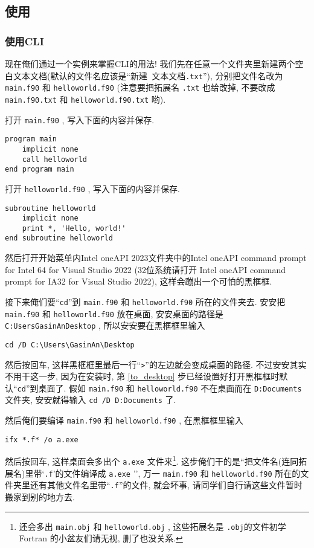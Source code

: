 \subsection{使用}\label{use_ifx}

\subsubsection{使用CLI}

现在俺们通过一个实例来掌握CLI的用法! 我们先在任意一个文件夹里新建两个空白文本文档(默认的文件名应该是``\textsf{新建}\texttt{\ }\textsf{文本文档}\texttt{.txt}''), 分别把文件名改为 \texttt{main.f90} 和 \texttt{helloworld.f90} (注意要把拓展名 \texttt{.txt} 也给改掉, 不要改成 \texttt{main.f90.txt} 和 \texttt{helloworld.f90.txt} 哟).

打开 \texttt{main.f90} , 写入下面的内容并保存.
\begin{lstlisting}
program main
    implicit none
    call helloworld
end program main
\end{lstlisting}

打开 \texttt{helloworld.f90} , 写入下面的内容并保存.
\begin{lstlisting}
subroutine helloworld
    implicit none
    print *, 'Hello, world!'
end subroutine helloworld
\end{lstlisting}

然后打开开始菜单内Intel oneAPI 2023文件夹中的Intel oneAPI command prompt for Intel 64 for Visual Studio 2022 (32位系统请打开 Intel oneAPI command prompt for IA32 for Visual Studio 2022), 这样会蹦出一个可怕的黑框框.

接下来俺们要``\texttt{cd}''到 \texttt{main.f90} 和 \texttt{helloworld.f90} 所在的文件夹去. 安安把 \texttt{main.f90} 和 \texttt{helloworld.f90} 放在桌面, 安安桌面的路径是\texttt{C:\bs{}Users\bs{}GasinAn\bs{}Desktop} , 所以安安要在黑框框里输入
\begin{verbatim}
cd /D C:\Users\GasinAn\Desktop
\end{verbatim}
然后按回车, 这样黑框框里最后一行``\texttt{>}''的左边就会变成桌面的路径. 不过安安其实不用干这一步, 因为在安装时, 第 \ref{to_desktop} 步已经设置好打开黑框框时默认``\texttt{cd}''到桌面了. 假如 \texttt{main.f90} 和 \texttt{helloworld.f90} 不在桌面而在 \texttt{D:\bs{}Documents} 文件夹, 安安就得输入 \texttt{cd /D D:\bs{}Documents} 了.

然后俺们要编译 \texttt{main.f90} 和 \texttt{helloworld.f90} , 在黑框框里输入
\begin{verbatim}
ifx *.f* /o a.exe
\end{verbatim}
然后按回车, 这样桌面会多出个 \texttt{a.exe} 文件来\footnote{还会多出 \texttt{main.obj} 和 \texttt{helloworld.obj} , 这些拓展名是 \texttt{.obj}的文件初学 Fortran 的小盆友们请无视, 删了也没关系.}. 这步俺们干的是``把文件名(连同拓展名)里带`\texttt{.f}'的文件编译成 \texttt{a.exe} '', 万一 \texttt{main.f90} 和 \texttt{helloworld.f90} 所在的文件夹里还有其他文件名里带``\texttt{.f}''的文件, 就会坏事, 请同学们自行请这些文件暂时搬家到别的地方去.

